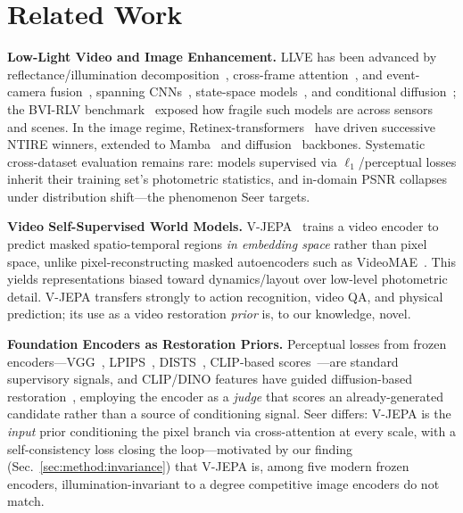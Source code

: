 \section{Related Work}\label{sec:related}

\noindent\textbf{Low-Light Video and Image Enhancement.} LLVE has been advanced by reflectance/illumination decomposition~\citep{stcd2025}, cross-frame attention~\citep{llve_seg}, and event-camera fusion~\citep{seeing_unseen}, spanning CNNs~\citep{stcd2025}, state-space models~\citep{bvi_mamba}, and conditional diffusion~\citep{bvi_rlv,dl_diff}; the BVI-RLV benchmark~\citep{bvi_rlv} exposed how fragile such models are across sensors and scenes. In the image regime, Retinex-transformers~\citep{retinexformer} have driven successive NTIRE winners, extended to Mamba~\citep{mamballie} and diffusion~\citep{lldiffusion} backbones. Systematic cross-dataset evaluation remains rare: models supervised via $\ell_1$/perceptual losses inherit their training set's photometric statistics, and in-domain PSNR collapses under distribution shift---the phenomenon Seer targets.

\noindent\textbf{Video Self-Supervised World Models.} V-JEPA~\citep{vjepa,vjepa2} trains a video encoder to predict masked spatio-temporal regions \emph{in embedding space} rather than pixel space, unlike pixel-reconstructing masked autoencoders such as VideoMAE~\citep{videomae}. This yields representations biased toward dynamics/layout over low-level photometric detail. V-JEPA transfers strongly to action recognition, video QA, and physical prediction; its use as a video restoration \emph{prior} is, to our knowledge, novel.

\noindent\textbf{Foundation Encoders as Restoration Priors.} Perceptual losses from frozen encoders---VGG~\citep{johnson_perceptual}, LPIPS~\citep{lpips}, DISTS~\citep{dists}, CLIP-based scores~\citep{clip_iqa}---are standard supervisory signals, and CLIP/DINO features have guided diffusion-based restoration~\citep{stablesr}, employing the encoder as a \emph{judge} that scores an already-generated candidate rather than a source of conditioning signal. Seer differs: V-JEPA is the \emph{input} prior conditioning the pixel branch via cross-attention at every scale, with a self-consistency loss closing the loop---motivated by our finding (Sec.~\ref{sec:method:invariance}) that V-JEPA is, among five modern frozen encoders, illumination-invariant to a degree competitive image encoders do not match.
